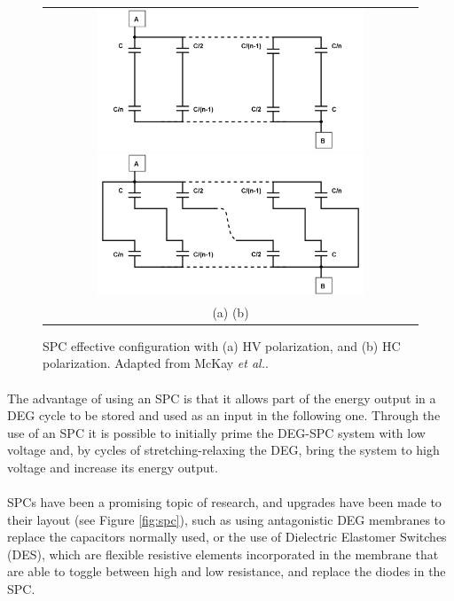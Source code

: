 \begin{figure}[ht]
\begin{center}
\begin{tabular}{c}
\includegraphics[height=4.2cm]{fig03/SPC_HV3.png}
\includegraphics[height=4.2cm]{fig03/SPC_HC3.png}\\
(a) \hspace{7cm} (b)
\end{tabular}
\end{center}
\caption 
{ \label{fig:spc_form}
SPC effective configuration with (a) HV polarization, and (b) HC polarization. Adapted from McKay \textit{et al.}\cite{SPCdesign}.} 
\end{figure} 

\paragraph{} The advantage of using an SPC is that it allows part of the energy output in a DEG cycle to be stored and used as an input in the following one. Through the use of an SPC it is possible to initially prime the DEG-SPC system with low voltage and, by cycles of stretching-relaxing the DEG, bring the system to high voltage and increase its energy output.

\paragraph{}SPCs have been a promising topic of research, and upgrades have been made to their layout (see Figure \ref{fig:spc}), such as using antagonistic DEG membranes to replace the capacitors normally used\cite{AntagSPC}, or the use of Dielectric Elastomer Switches (DES), which are flexible resistive  elements incorporated in the membrane that are able to toggle between high and low resistance, and replace the diodes in the SPC\cite{DESSPC}.

